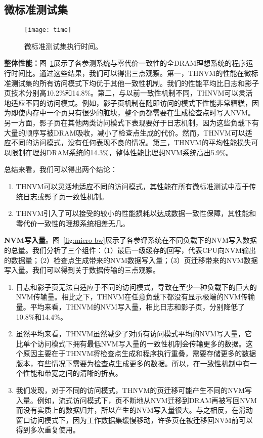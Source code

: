 \subsection{微标准测试集}

\begin{figure}[!ht]
  \centering
  \texttt{[image: time]}
  \caption{微标准测试集执行时间。}
  \label{fig:micro-time}
\end{figure}

\textbf{整体性能：}图~\ref{fig:micro-time}展示了各参测系统与零代价一致性的全DRAM理想系统的程序运行时间比。通过这些结果，我们可以得出三点观察。第一，THNVM的性能在微标准测试集的所有访问模式下均优于其他一致性机制。我们的性能平均比日志和影子页技术分别高10.2\%和14.8\%。第二，与以前一致性机制不同，THNVM可以灵活地适应不同的访问模式。例如，影子页机制在随即访问的模式下性能非常糟糕，因为即使内存中一个页只有很少的脏块，整个页都需要在生成检查点时写入NVM。另一方面，影子页在其他两类访问模式下表现要好于日志机制，因为这些负载下有大量的顺序写被DRAM吸收，减小了检查点生成的代价。然而，THNVM可以适应不同的访问模式，没有任何表现不良的情况。第三，THNVM的平均性能损失可以限制在理想DRAM系统的14.3\%，整体性能比理想NVM系统高出5.9\%。

总结来看，我们可以得出两个结论：
\begin{enumerate}
\item THNVM可以灵活地适应不同的访问模式，其性能在所有微标准测试中高于传统日志或影子页一致性机制。 
\item THNVM引入了可以接受的较小的性能损耗以达成数据一致性保障，其性能和零代价一致性的理想系统相差无几。
\end{enumerate}

\textbf{NVM写入量}。图~\ref{fig:micro-bw}展示了各参评系统在不同负载下的NVM写入数据的总量。我们分析了三个组件：（1）最后一级缓存的回写，代表CPU向NVM输出的数据量；（2）检查点生成带来的NVM数据写入量；（3）页迁移带来的NVM数据写入量。我们可以得到关于数据传输的三点观察。
\begin{enumerate}
\item 日志和影子页无法自适应于不同的访问模式，导致在至少一种负载下的巨大的NVM传输量。相比之下，THNVM在任意负载下都没有显示极端的NVM传输量。平均来看，THNVM的NVM写入量，相比日志和影子页，分别降低了10.8\%和14.4\%。
\item 虽然平均来看，THNVM虽然减少了对所有访问模式平均的NVM写入量，它比单个访问模式下拥有最低NVM写入量的一致性机制会传输更多的数据。这个原因主要在于THNVM将检查点生成和程序执行重叠，需要存储更多的数据版本，有些情况下需要为检查点生成更多的数据。所以，在一致性机制中有一个性能和带宽之间的清晰的折衷。
\item 我们发现，对于不同的访问模式，THNVM的页迁移可能产生不同的NVM写入量。例如，流式访问模式下，页不断地从NVM迁移到DRAM再被写回NVM而没有实质上的数据归并，所以产生的NVM写入量很大。与之相反，在滑动窗口访问模式下，因为工作数据集缓慢移动，许多页在被迁移回NVM前可以得到多次重复使用。 
\end{enumerate}

